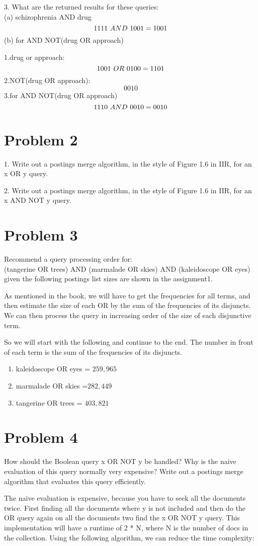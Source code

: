 \documentclass{article}
\begin{document}
3. What are the returned results for these queries:\\
(a) schizophrenia AND drug
$$ 1111 \ \mathnormal{AND}\ 1001 = 1001 $$
(b) for AND NOT(drug OR approach) 

1.drug or approach: 
$$ 1001 \ \mathnormal{OR}\ 0100 = 1101 $$
2.NOT(drug OR approach):
$$ 0010 $$
3.for AND NOT(drug OR approach)
$$ 1110 \ \mathnormal{AND}\ 0010 = 0010 $$

\section{Problem 2}
1. Write out a postings merge algorithm, in the style of Figure 1.6 in IIR, for an x OR y query.





2. Write out a postings merge algorithm, in the style of Figure 1.6 in IIR, for an x AND NOT y query.




\section{Problem 3}

Recommend a query processing order for: \\
(tangerine OR trees) AND (marmalade OR skies) AND (kaleidoscope OR eyes) given the following postings list sizes are shown in the assignment1.

As mentioned in the book, we will have to get the frequencies for all terms, and then estimate the size of each OR by the sum of the frequencies of its disjuncts. We can then process the query in increasing order of the size of each disjunctive term. 

So we will start with the following and continue to the end. The number in front of each term is the sum of the frequencies of its disjuncts.

\begin{enumerate}
\item kaleidoscope OR eyes = $259,965$
\item marmalade OR skies =$282,449$
\item tangerine OR trees = $403,821$
\end{enumerate}

\section{Problem 4}

How should the Boolean query x OR NOT y be handled? Why is the naive evaluation of this query normally very expensive? Write out a postings merge algorithm that evaluates this query efficiently.

The naive evaluation is expensive, because you have to seek all the documents twice. First finding all the documents where y is not included and then do the OR query again on all the documents two find the x OR NOT y query. This implementation will have a runtime of 2 * N, where N is the number of docs in the collection. Using the following algorithm, we can reduce the time complexity:


\end{document}
